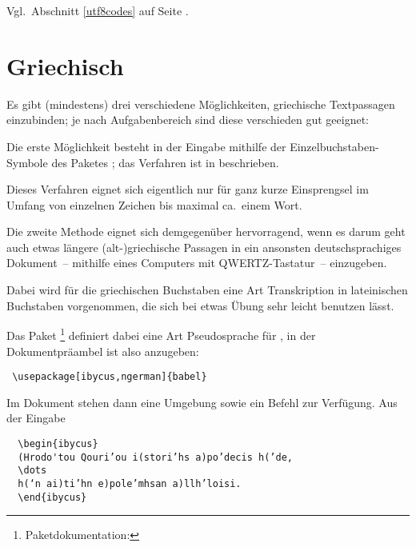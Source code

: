 
Vgl.\ Abschnitt \ref{utf8codes} auf Seite \pageref{utf8codes}.

\section{Griechisch}

Es gibt (mindestens) drei verschiedene Möglichkeiten, griechische Textpassagen einzubinden;
je nach Aufgabenbereich sind diese verschieden gut geeignet:



Die erste Möglichkeit besteht in der Eingabe mithilfe der Einzelbuchstaben-Symbole des Paketes
; das Verfahren ist in   beschrieben.

Dieses Verfahren eignet sich eigentlich nur für ganz kurze Einsprengsel im Umfang von
einzelnen Zeichen bis maximal ca.\ einem Wort.



Die zweite Methode eignet sich demgegenüber hervorragend, wenn es darum geht auch etwas
längere (alt-)griechische Passagen in ein ansonsten deutschsprachiges
Dokument~-- mithilfe eines Computers mit QWERTZ-Tastatur~-- einzugeben.

Dabei wird für die griechischen Buchstaben eine Art Transkription in lateinischen Buchstaben
vorgenommen, die sich bei etwas Übung sehr leicht benutzen lässt.

Das Paket %
\footnote{Paketdokumentation: }
definiert dabei eine Art Pseudosprache für ,
in der Dokumentpräambel ist also anzugeben:

\begin{lstlisting}
 \usepackage[ibycus,ngerman]{babel}
\end{lstlisting}

Im Dokument stehen dann eine Umgebung  sowie ein Befehl 
zur Verfügung. Aus der Eingabe

\begin{lstlisting}
  \begin{ibycus}
  (Hrodo'tou Qouri’ou i(stori’hs a)po’decis h(’de,
  \dots
  h(‘n ai)ti’hn e)pole’mhsan a)llh’loisi.
  \end{ibycus}
\end{lstlisting}

